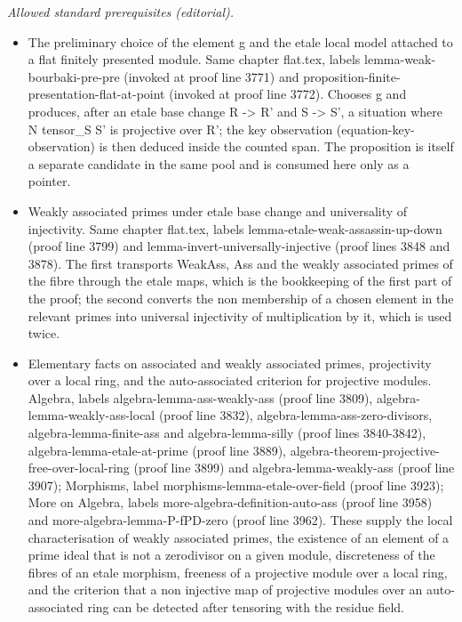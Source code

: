 \documentclass[10pt,a4paper]{amsart}
\theoremstyle{plain}
\theoremstyle{definition}
\theoremstyle{remark}
\numberwithin{equation}{subsection}
\begin{document}
\noindent\textit{Allowed standard prerequisites (editorial).}\begin{itemize}
\item The preliminary choice of the element g and the etale local model attached to a flat finitely presented module. Same chapter flat.tex, labels lemma-weak-bourbaki-pre-pre (invoked at proof line 3771) and proposition-finite-presentation-flat-at-point (invoked at proof line 3772). Chooses g and produces, after an etale base change R -> R' and S -> S', a situation where N tensor\_S S' is projective over R'; the key observation (equation-key-observation) is then deduced inside the counted span. The proposition is itself a separate candidate in the same pool and is consumed here only as a pointer.
\item Weakly associated primes under etale base change and universality of injectivity. Same chapter flat.tex, labels lemma-etale-weak-assassin-up-down (proof line 3799) and lemma-invert-universally-injective (proof lines 3848 and 3878). The first transports WeakAss, Ass and the weakly associated primes of the fibre through the etale maps, which is the bookkeeping of the first part of the proof; the second converts the non membership of a chosen element in the relevant primes into universal injectivity of multiplication by it, which is used twice.
\item Elementary facts on associated and weakly associated primes, projectivity over a local ring, and the auto-associated criterion for projective modules. Algebra, labels algebra-lemma-ass-weakly-ass (proof line 3809), algebra-lemma-weakly-ass-local (proof line 3832), algebra-lemma-ass-zero-divisors, algebra-lemma-finite-ass and algebra-lemma-silly (proof lines 3840-3842), algebra-lemma-etale-at-prime (proof line 3889), algebra-theorem-projective-free-over-local-ring (proof line 3899) and algebra-lemma-weakly-ass (proof line 3907); Morphisms, label morphisms-lemma-etale-over-field (proof line 3923); More on Algebra, labels more-algebra-definition-auto-ass (proof line 3958) and more-algebra-lemma-P-fPD-zero (proof line 3962). These supply the local characterisation of weakly associated primes, the existence of an element of a prime ideal that is not a zerodivisor on a given module, discreteness of the fibres of an etale morphism, freeness of a projective module over a local ring, and the criterion that a non injective map of projective modules over an auto-associated ring can be detected after tensoring with the residue field.
\end{itemize}\medskip
\end{document}
